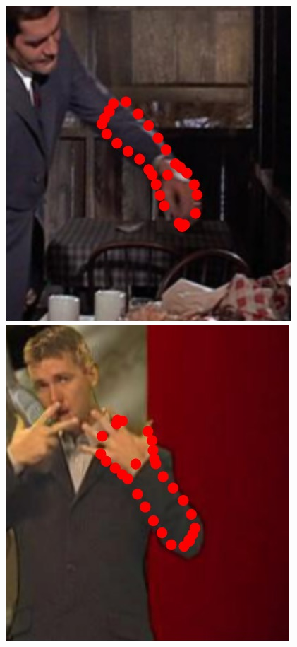 \begin{figure}
    \includegraphics[height=\ofh]{resources/Annotation_Correction/Suplementory_Meterial/ExFit/0003}
    \hfill
    \includegraphics[height=\ofh]{resources/Annotation_Correction/Suplementory_Meterial/ExFit/0004}
    \hfill

\end{figure}
